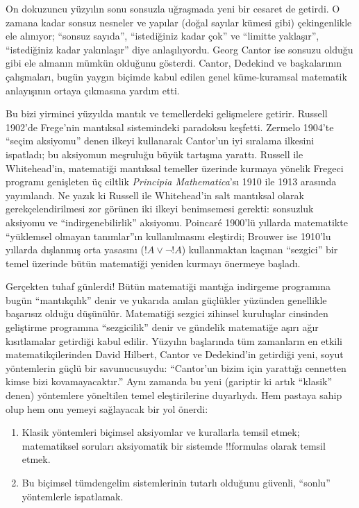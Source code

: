 \documentclass[../../../include/open-logic-section]{subfiles}
\begin{document}
On dokuzuncu yüzyılın sonu sonsuzla uğraşmada yeni bir cesaret de getirdi.
O zamana kadar sonsuz nesneler ve yapılar (doğal sayılar kümesi gibi)
çekingenlikle ele alınıyor; ``sonsuz sayıda'', ``istediğiniz kadar çok'' ve
``limitte yaklaşır'', ``istediğiniz kadar yakınlaşır'' diye anlaşılıyordu.
Georg Cantor ise sonsuzu olduğu gibi ele almanın mümkün olduğunu gösterdi.
Cantor, Dedekind ve başkalarının çalışmaları, bugün yaygın biçimde kabul
edilen genel küme-kuramsal matematik anlayışının ortaya çıkmasına yardım
etti.

Bu bizi yirminci yüzyılda mantık ve temellerdeki gelişmelere getirir.
Russell 1902'de Frege'nin mantıksal sistemindeki paradoksu keşfetti. Zermelo
1904'te ``seçim aksiyomu'' denen ilkeyi kullanarak Cantor'un iyi sıralama
ilkesini ispatladı; bu aksiyomun meşruluğu büyük tartışma yarattı. Russell
ile Whitehead'in, matematiği mantıksal temeller üzerinde kurmaya yönelik
Fregeci programı genişleten üç ciltlik \emph{Principia Mathematica}'sı
1910 ile 1913 arasında yayımlandı. Ne yazık ki Russell ile Whitehead'in salt
mantıksal olarak gerekçelendirilmesi zor görünen iki ilkeyi benimsemesi
gerekti: sonsuzluk aksiyomu ve ``indirgenebilirlik'' aksiyomu. Poincar\'e
1900'lü yıllarda matematikte ``yüklemsel olmayan tanımlar''ın kullanılmasını
eleştirdi; Brouwer ise 1910'lu yıllarda dışlanmış orta yasasını ($!A \lor
\lnot !A$) kullanmaktan kaçınan ``sezgici'' bir temel üzerinde bütün
matematiği yeniden kurmayı önermeye başladı.

Gerçekten tuhaf günlerdi!{} Bütün matematiği mantığa indirgeme programına
bugün ``mantıkçılık'' denir ve yukarıda anılan güçlükler yüzünden genellikle
başarısız olduğu düşünülür. Matematiği sezgici zihinsel kuruluşlar cinsinden
geliştirme programına ``sezgicilik'' denir ve gündelik matematiğe aşırı ağır
kısıtlamalar getirdiği kabul edilir. Yüzyılın başlarında tüm zamanların en
etkili matematikçilerinden David Hilbert, Cantor ve Dedekind'in getirdiği
yeni, soyut yöntemlerin güçlü bir savunucusuydu: ``Cantor'un bizim için
yarattığı cennetten kimse bizi kovamayacaktır.'' Aynı zamanda bu yeni
(gariptir ki artık ``klasik'' denen) yöntemlere yöneltilen temel eleştirilerine
duyarlıydı. Hem pastaya sahip olup hem onu yemeyi sağlayacak bir yol önerdi:
\begin{enumerate}
\item Klasik yöntemleri biçimsel aksiyomlar ve kurallarla temsil etmek;
  matematiksel soruları aksiyomatik bir sistemde !!{formula}s olarak
  temsil etmek.
\item Bu biçimsel tümdengelim sistemlerinin tutarlı olduğunu güvenli,
  ``sonlu'' yöntemlerle ispatlamak.
\end{enumerate}
\end{document}
